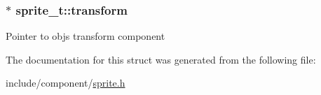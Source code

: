 \subsubsection[{\texorpdfstring{transform}{transform}}]{$\ast$ sprite\+\_\+t\+::transform}\hypertarget{structsprite__t_a75832530a950033696778cb7f566b357}{}\label{structsprite__t_a75832530a950033696778cb7f566b357}
Pointer to obj\textquotesingle{}s transform component 

The documentation for this struct was generated from the following file\+:\begin{DoxyCompactItemize}
\item 
include/component/\hyperlink{sprite_8h}{sprite.\+h}\end{DoxyCompactItemize}
